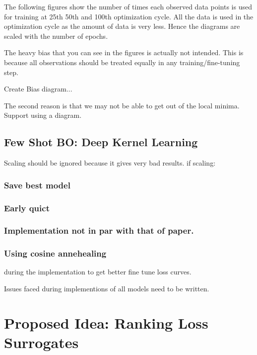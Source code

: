 \documentclass[11pt]{report}
\begin{document}
The following figures show the number of times each observed data points is used for training at 25th 50th and 100th optimization cycle.
All the data is used in the optimization cycle as the amount of data is very less.
Hence the diagrams are scaled with the number of epochs.

The heavy bias that you can see in the figures is actually not intended.
This is because all observations should be treated equally in any training/fine-tuning step.

Create Bias diagram...

The second reason is that we may not be able to get out of the local minima.
Support using a diagram.

\section{Few Shot BO: Deep Kernel Learning}
Scaling should be ignored because it gives very bad results.
if scaling:



\subsection{Save best model}

\subsection{Early quict}

\subsection{Implementation not in par with that of paper.}

\subsection{Using cosine annehealing }
during the implementation to get better fine tune loss curves.


Issues faced during implementions of all models need to be written.

\chapter{Proposed Idea: Ranking Loss Surrogates}
\end{document}
